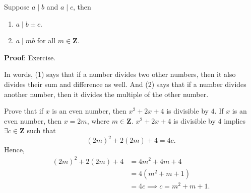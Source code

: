 \begin{Corollary}{}{}
    Suppose $ a\mid b $ and $ a\mid c $, then
    \begin{enumerate}[(1)]
        \item $ a\mid b\pm c $.
        \item $ a\mid mb $ for all $ m\in\mathbf{Z} $.
    \end{enumerate}
    \tcblower{}
    \textbf{Proof}: Exercise.

    In words, (1) says that if a number divides two other numbers, then it also
    divides their sum and difference as well. And (2) says that if a number divides
    another number, then it divides the multiple of the other number.
\end{Corollary}
\begin{Example}{}{}
    Prove that if $ x $ is an even number, then $ x^2+2x+4 $ is divisible by $ 4 $.
    \tcblower{}
    If $ x $ is an even number, then $ x=2m $, where $ m\in\mathbf{Z} $.
    $ x^2+2x+4 $ is divisible by $ 4 $ implies $ \exists c\in\mathbf{Z} $ such that
    \[ (2m)^2+2(2m)+4=4c. \]
    Hence,
    \begin{align*}
        (2m)^2+2(2m)+4
         & =4m^2+4m+4  \\
         & =4(m^2+m+1) \\
         & =4c
        \implies c=m^2+m+1.
    \end{align*}
\end{Example}
